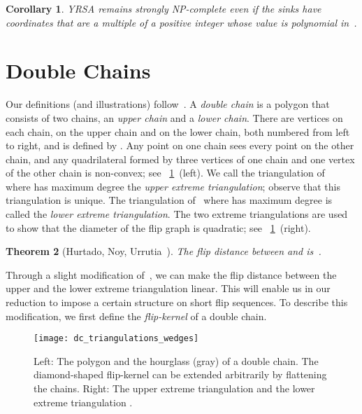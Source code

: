 \documentclass[a4paper,11pt]{article}
\newtheorem{theorem}{Theorem}[section]
\newtheorem{corollary}[theorem]{Corollary}
\newcommand{\noproof}{~\hfill}
\begin{document}
\begin{corollary}\label{cor_blow_up}
YRSA remains strongly NP-complete even if the sinks have coordinates that are a multiple of a positive integer whose value is polynomial in~.
\end{corollary}

\section{Double Chains}\label{sec:double_chain}
Our definitions (and illustrations) follow~\cite{point_set_hard}.  A \emph{double
chain}  is a polygon
that consists of two chains, an \emph{upper chain} and a \emph{lower chain}.
There are  vertices on each chain,  on the
upper chain and  on the lower chain,
both numbered from left to right, and  is defined by .
Any point on one chain sees every point on the other chain, and any quadrilateral formed by three vertices of one chain and one vertex of the other chain is non-convex;
see \figurename~\ref{fig_dc_triangulations_wedges}~(left).
We call the triangulation  of~ where  has maximum degree the
\emph{upper extreme triangulation}; observe that this triangulation is unique.  
The triangulation  of~ where  has maximum degree
is called the \emph{lower extreme triangulation}.  The two extreme triangulations
are used to show that the diameter of the flip graph is quadratic; see \figurename~\ref{fig_dc_triangulations_wedges}~(right).

\begin{theorem}[Hurtado, Noy, Urrutia~\cite{hurtado_noy_urrutia}]\label{thm_dc}
The flip distance between  and  is~\mbox{}.\noproof
\end{theorem}

Through a slight modification of~, we can make the flip distance between the upper and the lower extreme triangulation linear.
This will enable us in our reduction to impose a certain structure on short flip sequences.
To describe this modification, we first define the \emph{flip-kernel} of a double chain.

\begin{figure}
\centering
\texttt{[image: dc\_triangulations\_wedges]}
\caption{
Left: The polygon and the hourglass (gray) of a double chain. The diamond-shaped
flip-kernel can be extended arbitrarily by flattening the chains.
Right: The upper extreme triangulation  and the lower extreme triangulation . 
}
\label{fig_dc_triangulations_wedges}
\end{figure}
\end{document}
